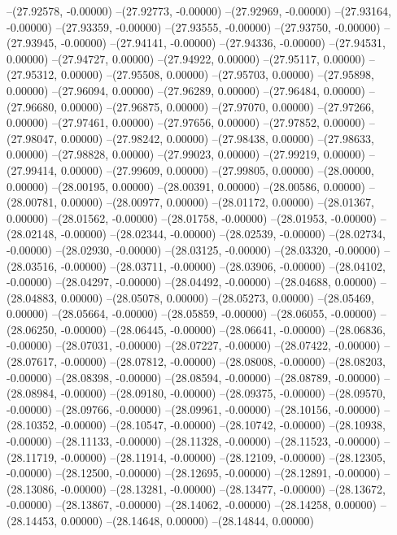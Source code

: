--(27.92578, -0.00000)
--(27.92773, -0.00000)
--(27.92969, -0.00000)
--(27.93164, -0.00000)
--(27.93359, -0.00000)
--(27.93555, -0.00000)
--(27.93750, -0.00000)
--(27.93945, -0.00000)
--(27.94141, -0.00000)
--(27.94336, -0.00000)
--(27.94531, 0.00000)
--(27.94727, 0.00000)
--(27.94922, 0.00000)
--(27.95117, 0.00000)
--(27.95312, 0.00000)
--(27.95508, 0.00000)
--(27.95703, 0.00000)
--(27.95898, 0.00000)
--(27.96094, 0.00000)
--(27.96289, 0.00000)
--(27.96484, 0.00000)
--(27.96680, 0.00000)
--(27.96875, 0.00000)
--(27.97070, 0.00000)
--(27.97266, 0.00000)
--(27.97461, 0.00000)
--(27.97656, 0.00000)
--(27.97852, 0.00000)
--(27.98047, 0.00000)
--(27.98242, 0.00000)
--(27.98438, 0.00000)
--(27.98633, 0.00000)
--(27.98828, 0.00000)
--(27.99023, 0.00000)
--(27.99219, 0.00000)
--(27.99414, 0.00000)
--(27.99609, 0.00000)
--(27.99805, 0.00000)
--(28.00000, 0.00000)
--(28.00195, 0.00000)
--(28.00391, 0.00000)
--(28.00586, 0.00000)
--(28.00781, 0.00000)
--(28.00977, 0.00000)
--(28.01172, 0.00000)
--(28.01367, 0.00000)
--(28.01562, -0.00000)
--(28.01758, -0.00000)
--(28.01953, -0.00000)
--(28.02148, -0.00000)
--(28.02344, -0.00000)
--(28.02539, -0.00000)
--(28.02734, -0.00000)
--(28.02930, -0.00000)
--(28.03125, -0.00000)
--(28.03320, -0.00000)
--(28.03516, -0.00000)
--(28.03711, -0.00000)
--(28.03906, -0.00000)
--(28.04102, -0.00000)
--(28.04297, -0.00000)
--(28.04492, -0.00000)
--(28.04688, 0.00000)
--(28.04883, 0.00000)
--(28.05078, 0.00000)
--(28.05273, 0.00000)
--(28.05469, 0.00000)
--(28.05664, -0.00000)
--(28.05859, -0.00000)
--(28.06055, -0.00000)
--(28.06250, -0.00000)
--(28.06445, -0.00000)
--(28.06641, -0.00000)
--(28.06836, -0.00000)
--(28.07031, -0.00000)
--(28.07227, -0.00000)
--(28.07422, -0.00000)
--(28.07617, -0.00000)
--(28.07812, -0.00000)
--(28.08008, -0.00000)
--(28.08203, -0.00000)
--(28.08398, -0.00000)
--(28.08594, -0.00000)
--(28.08789, -0.00000)
--(28.08984, -0.00000)
--(28.09180, -0.00000)
--(28.09375, -0.00000)
--(28.09570, -0.00000)
--(28.09766, -0.00000)
--(28.09961, -0.00000)
--(28.10156, -0.00000)
--(28.10352, -0.00000)
--(28.10547, -0.00000)
--(28.10742, -0.00000)
--(28.10938, -0.00000)
--(28.11133, -0.00000)
--(28.11328, -0.00000)
--(28.11523, -0.00000)
--(28.11719, -0.00000)
--(28.11914, -0.00000)
--(28.12109, -0.00000)
--(28.12305, -0.00000)
--(28.12500, -0.00000)
--(28.12695, -0.00000)
--(28.12891, -0.00000)
--(28.13086, -0.00000)
--(28.13281, -0.00000)
--(28.13477, -0.00000)
--(28.13672, -0.00000)
--(28.13867, -0.00000)
--(28.14062, -0.00000)
--(28.14258, 0.00000)
--(28.14453, 0.00000)
--(28.14648, 0.00000)
--(28.14844, 0.00000)
